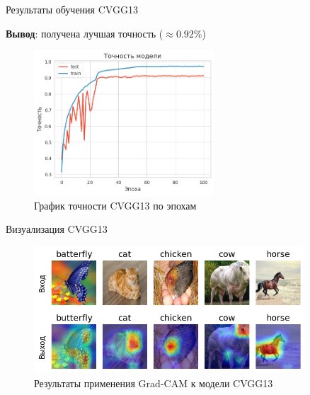 \documentclass[12pt]{beamer}
\begin{document}
\begin{frame}{Результаты обучения CVGG13}
    \begin{center}
        \textbf{Вывод}: получена лучшая точность ($\approx 0.92\%$)
    \end{center}
    \begin{figure}[ht]
        \centering
        \includegraphics[width=0.6\textwidth]{images/cvgg13_f1.png}
        \caption{График точности CVGG13 по эпохам}
        \label{fig:cvgg13_f1}
    \end{figure}
\end{frame}

\begin{frame}{Визуализация CVGG13}
    \begin{figure}[ht]
        \centering
        \includegraphics[width=0.9\textwidth]{images/cvgg13_out_1.png}
        \caption{Результаты применения Grad-CAM к модели CVGG13}
        \label{fig:cvgg13_gradcam_1}
    \end{figure}
\end{frame}
\end{document}

